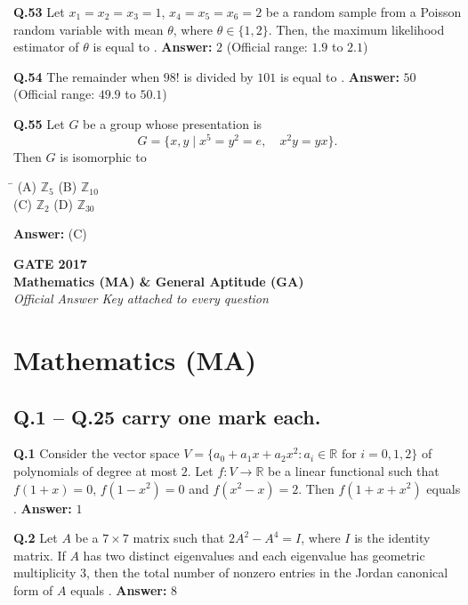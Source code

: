 \documentclass[11pt,a4paper]{article}
\newcommand{\optsfourA}[4]{%
  \begin{tabbing}
    \hspace{0.48\linewidth}\=\kill
    (A) #1 \> (B) #2 \\[2pt]
    (C) #3 \> (D) #4
  \end{tabbing}%
}
\newcommand{\ans}[1]{\textbf{Answer:} #1\par\medskip}
\begin{document}
\textbf{Q.53} Let $x_1 = x_2 = x_3 = 1$, $x_4 = x_5 = x_6 = 2$ be a random sample from a Poisson random variable with mean $\theta$, where $\theta \in \{1, 2\}$. Then, the maximum likelihood estimator of $\theta$ is equal to \underline{\hspace{2cm}}.
\ans{$2$ (Official range: $1.9$ to $2.1$)}

\textbf{Q.54} The remainder when $98!$ is divided by $101$ is equal to \underline{\hspace{2cm}}.
\ans{$50$ (Official range: $49.9$ to $50.1$)}

\textbf{Q.55} Let $G$ be a group whose presentation is
\[
  G = \{x, y \mid x^5 = y^2 = e,\quad x^2 y = y x\}.
\]
Then $G$ is isomorphic to
\optsfourA{$\mathbb{Z}_5$}{$\mathbb{Z}_{10}$}{$\mathbb{Z}_2$}{$\mathbb{Z}_{30}$}
\ans{(C)}

\newpage


\begin{center}
  {\LARGE\bfseries GATE 2017}\\[4pt]
  {\large\bfseries Mathematics (MA) \& General Aptitude (GA)}\\[2pt]
  {\small\itshape Official Answer Key attached to every question}
\end{center}
\medskip

\section*{Mathematics (MA)}

\subsection*{Q.1 -- Q.25 carry one mark each.}

\textbf{Q.1} Consider the vector space $V = \{a_0 + a_1 x + a_2 x^2 : a_i \in \mathbb{R} \text{ for } i = 0, 1, 2\}$ of polynomials of degree at most $2$. Let $f : V \to \mathbb{R}$ be a linear functional such that $f(1 + x) = 0$, $f(1 - x^2) = 0$ and $f(x^2 - x) = 2$. Then $f(1 + x + x^2)$ equals \underline{\hspace{2cm}}.
\ans{$1$}

\textbf{Q.2} Let $A$ be a $7 \times 7$ matrix such that $2A^2 - A^4 = I$, where $I$ is the identity matrix. If $A$ has two distinct eigenvalues and each eigenvalue has geometric multiplicity $3$, then the total number of nonzero entries in the Jordan canonical form of $A$ equals \underline{\hspace{2cm}}.
\ans{$8$}
\end{document}
